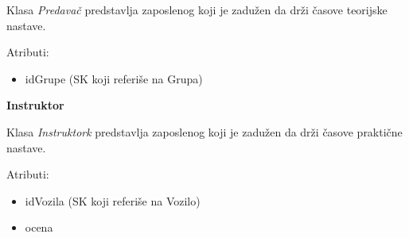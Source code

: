 Klasa \textit{Predavač} predstavlja zaposlenog koji je zadužen da drži časove teorijske nastave.

Atributi:
\begin{itemize}
    \item idGrupe (SK koji referiše na Grupa)
\end{itemize}

\textbf{\large Instruktor}
\vspace{0.3cm}

Klasa \textit{Instruktork} predstavlja zaposlenog koji je zadužen da drži časove praktične nastave.

Atributi:
\begin{itemize}
    \item idVozila (SK koji referiše na Vozilo)
    \item ocena
\end{itemize}
